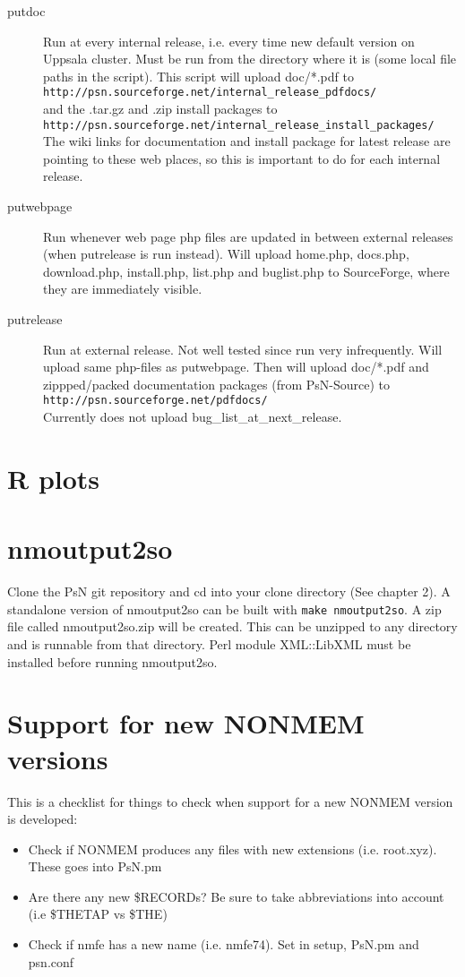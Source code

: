 \begin{description}
\item[putdoc] Run at every internal release, i.e. every time new default
version on Uppsala cluster. Must be run from the directory where it is
(some local file paths in the script). This script will upload doc/*.pdf to \\
\verb|http://psn.sourceforge.net/internal_release_pdfdocs/| \\
and the .tar.gz and .zip install packages to\\
\verb|http://psn.sourceforge.net/internal_release_install_packages/|
The wiki links for documentation and install package for latest
release are pointing to these web places, so this is important to
do for each internal release.
\item[putwebpage] Run whenever web page php files are updated in between
external releases (when putrelease is run instead).
Will upload home.php, docs.php, download.php, install.php, list.php and
buglist.php to SourceForge, where they are immediately visible.
\item[putrelease] Run at external release. Not well tested since run very
infrequently. Will upload same php-files as putwebpage. Then will
upload doc/*.pdf and zippped/packed documentation packages (from PsN-Source)
to \\
\verb|http://psn.sourceforge.net/pdfdocs/|\\
Currently does not upload bug\_list\_at\_next\_release.
\end{description}
\section{R plots}


\section{nmoutput2so}
Clone the PsN git repository and cd into your clone directory (See chapter 2). A standalone version of nmoutput2so can be built with \verb|make nmoutput2so|. A zip file called nmoutput2so.zip will be created. This can be unzipped
to any directory and is runnable from that directory.
Perl module XML::LibXML must be installed before running nmoutput2so.

\section{Support for new NONMEM versions}
This is a checklist for things to check when support for a new NONMEM version is developed:
\begin{itemize}
    \item Check if NONMEM produces any files with new extensions (i.e. root.xyz). These goes into PsN.pm
    \item Are there any new \$RECORDs? Be sure to take abbreviations into account (i.e \$THETAP vs \$THE)
    \item Check if nmfe has a new name (i.e. nmfe74). Set in setup, PsN.pm and psn.conf
\end{itemize}


